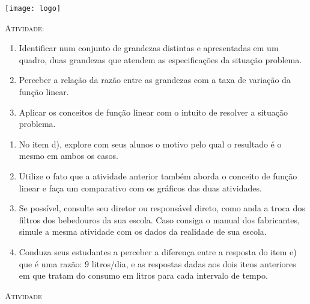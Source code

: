 \documentclass[10 pt,usenames,dvipsnames, oneside]{article}
\begin{document}
\begin{center}
  \begin{minipage}[l]{3cm}
\texttt{[image: logo]}    
\end{minipage}\hfill
\begin{minipage}[r]{.8\textwidth}
 {\Large \scshape Atividade: }  
\end{minipage}
\end{center}
\vspace{.2cm}

\ifdefined\prof
\begin{objetivos}
\item \phantom{a}
\end{objetivos}

\begin{goals}
\begin{enumerate}
\item Identificar num conjunto de grandezas distintas e apresentadas em um quadro, duas grandezas que atendem as especificações da situação problema.
\item Perceber a relação da razão entre as grandezas com a taxa de variação da função linear.
\item Aplicar os conceitos de função linear com o intuito de resolver a situação problema.
\end{enumerate}

\tcblower
\begin{enumerate}
\item No item d), explore com seus alunos o motivo pelo qual o resultado é o mesmo em ambos os casos.
\item Utilize o fato que a atividade anterior também aborda o conceito de função linear e faça um comparativo com os gráficos das duas atividades.
\item Se possível, consulte seu diretor ou responsável direto, como anda a troca dos filtros dos bebedouros da sua escola. Caso consiga o manual dos fabricantes, simule a mesma atividade com os dados da realidade de sua escola.
\item Conduza seus estudantes a perceber a diferença entre a resposta do item e) que é uma razão: $9$ litros/dia, e as respostas dadas aos dois itens anteriores em que tratam do consumo em litros para cada intervalo de tempo.
\end{enumerate}

\end{goals}

\bigskip
\begin{center}
{\large \scshape Atividade}
\end{center}
\fi
\end{document}
